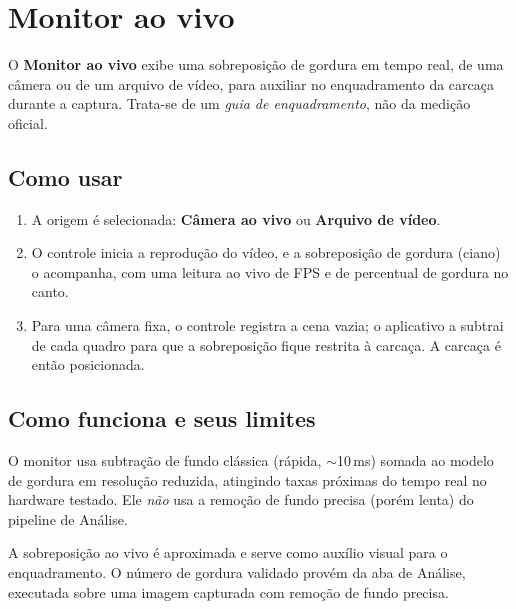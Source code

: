 \chapter{Monitor ao vivo}


\vspace{4pt}
O \textbf{Monitor ao vivo} exibe uma sobreposição de gordura em tempo real, de uma câmera ou de um
arquivo de vídeo, para auxiliar no enquadramento da carcaça durante a captura. Trata-se de um
\emph{guia de enquadramento}, não da medição oficial.

\section{Como usar}


\begin{enumerate}[leftmargin=1.4em,itemsep=3pt]
  \item A origem é selecionada: \textbf{Câmera ao vivo} ou \textbf{Arquivo de vídeo}.
  \item O controle  inicia a reprodução do vídeo, e a sobreposição de gordura
        (ciano) o acompanha, com uma leitura ao vivo de FPS e de percentual de gordura no canto.
  \item Para uma câmera fixa, o controle  registra a cena vazia;
        o aplicativo a subtrai de cada quadro para que a sobreposição fique restrita à
        carcaça. A carcaça é então posicionada.
\end{enumerate}

\section{Como funciona e seus limites}

O monitor usa subtração de fundo clássica (rápida, $\sim$10\,ms) somada ao
modelo de gordura em resolução reduzida, atingindo taxas próximas do tempo real no
hardware testado. Ele \emph{não} usa a remoção de fundo precisa (porém lenta)
do pipeline de Análise.

\begin{caution}[title={Guia de enquadramento, não o número validado}]
A sobreposição ao vivo é aproximada e serve como auxílio visual para o enquadramento. O
número de gordura validado provém da aba de Análise, executada sobre uma imagem capturada com
remoção de fundo precisa.
\end{caution}
